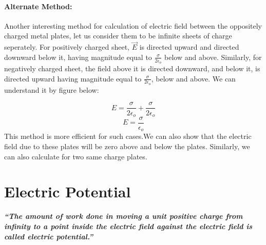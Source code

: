 \paragraph{Alternate Method:}
Another interesting method for calculation of electric field between
the oppositely charged metal plates, let us consider them to be infinite
sheets of charge seperately. For positively charged sheet, $\vec{E}$
is directed upward and directed downward below it,
having magnitude equal to $\frac{\sigma}{2\epsilon_{o}}$ below and above.
Similarly, for negatively charged sheet, the field above it is directed downward,
and below it, is directed upward having magnitude equal to $\frac{\sigma}{2\epsilon_{o}}$,
below and above. We can understand it by figure below:

\begin{equation}
  E = \frac{\sigma}{2\epsilon_{o}} + \frac{\sigma}{2\epsilon_{o}} \nonumber
\end{equation}
\begin{equation}
  E = \frac{\sigma}{\epsilon_{o}} \nonumber
\end{equation}
This method is more efficient for such cases.We can also show that the
electric field due to these plates will be zero above and below the plates.
Similarly, we can also calculate for two same charge plates.

\section{Electric Potential}
\textit{\textbf{“The amount of work done in moving a unit positive charge
from infinity to a point inside the electric field
against the electric field is called electric potential.”}}
